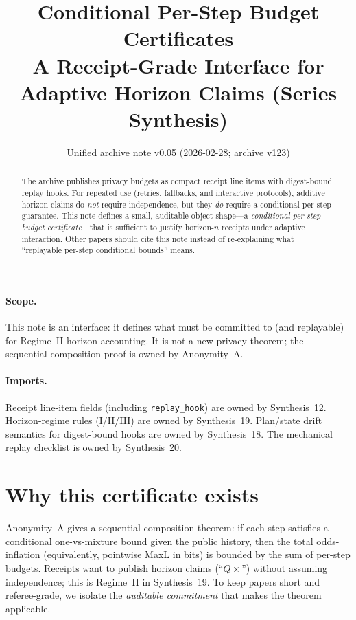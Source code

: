 \documentclass[11pt]{article}
\title{Conditional Per-Step Budget Certificates\\
\large A Receipt-Grade Interface for Adaptive Horizon Claims (Series Synthesis)}
\author{}
\date{Unified archive note v0.05 (2026-02-28; archive v123)}
\begin{document}
\maketitle

\begin{abstract}
The archive publishes privacy budgets as compact receipt line items with digest-bound replay hooks.
For repeated use (retries, fallbacks, and interactive protocols), additive horizon claims do \emph{not} require independence,
but they \emph{do} require a conditional per-step guarantee.
This note defines a small, auditable object shape---a \emph{conditional per-step budget certificate}---that is sufficient to justify
horizon-$n$ receipts under adaptive interaction.
Other papers should cite this note instead of re-explaining what ``replayable per-step conditional bounds'' means.
\end{abstract}

\paragraph{Scope.}
This note is an interface: it defines what must be committed to (and replayable) for Regime~II horizon accounting.
It is not a new privacy theorem; the sequential-composition proof is owned by Anonymity~A.\cite{series:oddsinflation}

\paragraph{Imports.}
Receipt line-item fields (including \texttt{replay\_hook}) are owned by Synthesis~12.\cite{series:receiptitems}
Horizon-regime rules (I/II/III) are owned by Synthesis~19.\cite{series:accountingrulebook}
Plan/state drift semantics for digest-bound hooks are owned by Synthesis~18.\cite{series:planstateequiv}
The mechanical replay checklist is owned by Synthesis~20.\cite{series:auditorreplay}

\section{Why this certificate exists}
Anonymity~A gives a sequential-composition theorem: if each step satisfies a conditional one-vs-mixture bound given the public history,
then the total odds-inflation (equivalently, pointwise MaxL in bits) is bounded by the sum of per-step budgets.\cite{series:oddsinflation}
Receipts want to publish horizon claims (``$Q\times$'') without assuming independence; this is Regime~II in Synthesis~19.\cite{series:accountingrulebook}
To keep papers short and referee-grade, we isolate the \emph{auditable commitment} that makes the theorem applicable.
\end{document}
